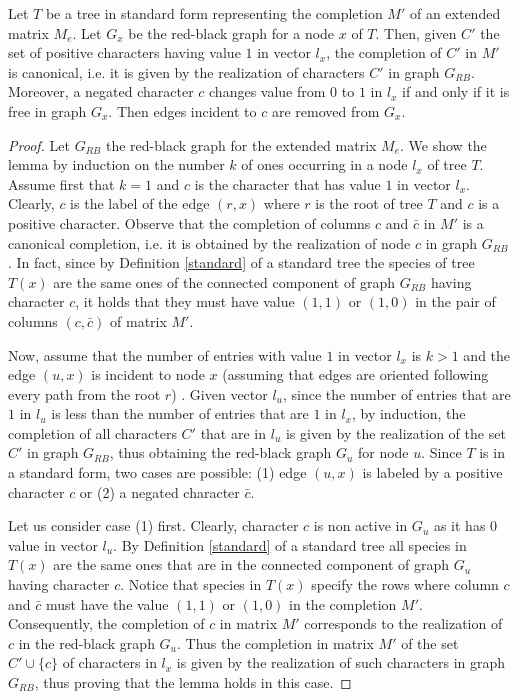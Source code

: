 \documentclass{llncs}
\newcommand{\grb}{$G_{RB}$ }
\begin{document}
\begin{lemma}
\label{prelim-annotated}
Let $T$ be a tree in standard form representing the completion $M'$ of an extended matrix $M_e$. Let $G_x$ be the red-black graph for a node $x$ of $T$.
 Then, given $C'$ the set of positive characters having value $1$ in vector $l_x$, the completion of $C'$ in $M'$ is canonical, i.e. it is given by the realization of characters $C'$ in graph   $G_{RB}$.   Moreover,  a negated character  $c$ changes value from $0$ to $1$ in $l_x$ if and only if it is free in graph $G_x$. Then edges incident to  $c$ are removed from $G_x$.

\end{lemma}

\begin{proof}
Let $G_{RB}$ the red-black graph for the extended matrix $M_e$.
We show the lemma by induction on the number $k$ of ones occurring in a node $l_x$ of tree $T$. 
Assume first that $k =1$ and $c$ is the character that has value $1$ in vector $l_x$. Clearly, $c$ is the  label of the edge $(r,x)$ where $r$ is the root of tree $T$ and $c$ is a positive character. Observe that the completion of columns $c$ and $\bar{c}$ in $M'$ is a canonical completion, i.e.  it is obtained by the realization of node $c$ in graph $G_{RB}$.   In fact,  since by  Definition \ref{standard} of a standard tree   the  species of tree $T(x)$  are  the same ones of the  connected component of graph \grb  having  character $c$, it holds that they must have value $(1,1)$  or $(1,0)$ in  the pair of columns $(c, \bar{c})$ of matrix $M'$. 


Now, assume that the number of entries with value $1$ in  vector $l_x$ is $k >1$ and the edge $(u,x)$  is incident to node $x$ (assuming that edges are oriented following every path from the root $r$) .
Given vector $l_u$, since the number of  entries that are $1$ in $l_u$ is less than the number of  entries that are $1$ in $l_x$,  by induction, the completion of all characters $C'$  that are in $l_u$ is given by the realization of the set $C'$ in graph $G_{RB}$, thus obtaining  the red-black graph $G_u$  for node $u$.   
Since $T$ is in a standard form,   two cases are possible: (1) edge $(u,x)$ is labeled by a positive character $c$ or   (2) a negated character $\bar{c}$. 

Let us consider case (1) first.
Clearly, character $c$ is non active in $G_u$ as it has $0$ value in vector $l_u$.
 By Definition  \ref{standard} of a standard tree all species in $T(x)$ are the same ones that are in the  connected component of graph $G_u$ having character $c$.  Notice that    species in $T(x)$  specify    the rows where column $c$ and $\bar{c}$ must have the value $(1,1)$ or $(1,0)$ in the  completion $M'$. Consequently, the completion of $c$ in matrix $M'$ corresponds to the realization of $c$ in the red-black graph $G_u$. Thus the completion in matrix $M'$ of  the set $C' \cup \{c\}$ of  characters in $l_x$ is given by the realization of such characters in graph $G_{RB}$, thus proving that the lemma holds in this case.
 

\end{proof}
\end{document}
